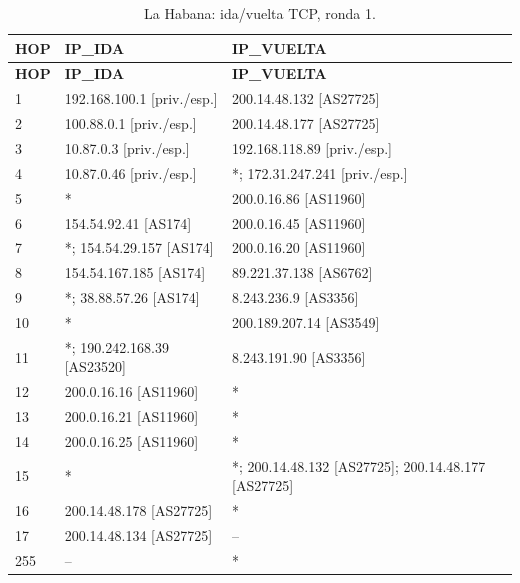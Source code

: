 \begin{longtable}{p{0.95cm}p{7.075cm}p{7.075cm}}
\caption{La Habana: ida/vuelta TCP, ronda 1.}\label{anexo:vuelta:200.14.48.134:TCP:1} \\
\toprule
\textbf{HOP} & \textbf{IP\_\allowbreak{}IDA} & \textbf{IP\_\allowbreak{}VUELTA} \\ \midrule
\endfirsthead
\toprule
\textbf{HOP} & \textbf{IP\_\allowbreak{}IDA} & \textbf{IP\_\allowbreak{}VUELTA} \\ \midrule
\endhead
1 & 192.168.100.1 [priv./esp.] & 200.14.48.132 [AS27725] \\
2 & 100.88.0.1 [priv./esp.] & 200.14.48.177 [AS27725] \\
3 & 10.87.0.3 [priv./esp.] & 192.168.118.89 [priv./esp.] \\
4 & 10.87.0.46 [priv./esp.] & *; 172.31.247.241 [priv./esp.] \\
5 & * & 200.0.16.86 [AS11960] \\
6 & 154.54.92.41 [AS174] & 200.0.16.45 [AS11960] \\
7 & *; 154.54.29.157 [AS174] & 200.0.16.20 [AS11960] \\
8 & 154.54.167.185 [AS174] & 89.221.37.138 [AS6762] \\
9 & *; 38.88.57.26 [AS174] & 8.243.236.9 [AS3356] \\
10 & * & 200.189.207.14 [AS3549] \\
11 & *; 190.242.168.39 [AS23520] & 8.243.191.90 [AS3356] \\
12 & 200.0.16.16 [AS11960] & * \\
13 & 200.0.16.21 [AS11960] & * \\
14 & 200.0.16.25 [AS11960] & * \\
15 & * & *; 200.14.48.132 [AS27725]; 200.14.48.177 [AS27725] \\
16 & 200.14.48.178 [AS27725] & * \\
17 & 200.14.48.134 [AS27725] & -- \\
255 & -- & * \\
\bottomrule
\end{longtable}
\endgroup

